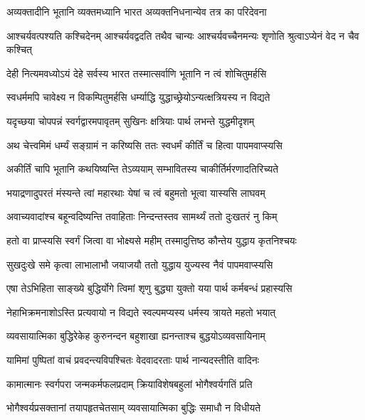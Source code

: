 \twolineshloka
{अव्यक्तादीनि भूतानि व्यक्तमध्यानि भारत}
{अव्यक्तनिधनान्येव तत्र का परिदेवना}%

\fourlineindentedshloka
{आश्चर्यवत्पश्यति कश्चिदेनम्}
{आश्चर्यवद्वदति तथैव चान्यः}
{आश्चर्यवच्चैनमन्यः शृणोति}
{श्रुत्वाऽप्येनं वेद न चैव कश्चित्}%

\twolineshloka
{देही नित्यमवध्योऽयं देहे सर्वस्य भारत}
{तस्मात्सर्वाणि भूतानि न त्वं शोचितुमर्हसि}%

\twolineshloka
{स्वधर्ममपि चावेक्ष्य न विकम्पितुमर्हसि}
{धर्म्याद्धि युद्धाच्छ्रेयोऽन्यत्क्षत्रियस्य न विद्यते}%

\twolineshloka
{यदृच्छया चोपपन्नं स्वर्गद्वारमपावृतम्}
{सुखिनः क्षत्रियाः पार्थ लभन्ते युद्धमीदृशम्}%

\twolineshloka
{अथ चेत्त्वमिमं धर्म्यं सङ्ग्रामं न करिष्यसि}
{ततः स्वधर्मं कीर्तिं च हित्वा पापमवाप्स्यसि}%

\twolineshloka
{अकीर्तिं चापि भूतानि कथयिष्यन्ति तेऽव्ययाम्}
{सम्भावितस्य चाकीर्तिर्मरणादतिरिच्यते}%

\twolineshloka
{भयाद्रणादुपरतं मंस्यन्ते त्वां महारथाः}
{येषां च त्वं बहुमतो भूत्वा यास्यसि लाघवम्}%

\twolineshloka
{अवाच्यवादांश्च बहून्वदिष्यन्ति तवाहिताः}
{निन्दन्तस्तव सामर्थ्यं ततो दुःखतरं नु किम्}%

\twolineshloka
{हतो वा प्राप्स्यसि स्वर्गं जित्वा वा भोक्ष्यसे महीम्}
{तस्मादुत्तिष्ठ कौन्तेय युद्धाय कृतनिश्चयः}%

\twolineshloka
{सुखदुःखे समे कृत्वा लाभालाभौ जयाजयौ}
{ततो युद्धाय युज्यस्व नैवं पापमवाप्स्यसि}%

\twolineshloka
{एषा तेऽभिहिता साङ्ख्ये बुद्धिर्योगे त्विमां शृणु}
{बुद्ध्या युक्तो यया पार्थ कर्मबन्धं प्रहास्यसि}%

\twolineshloka
{नेहाभिक्रमनाशोऽस्ति प्रत्यवायो न विद्यते}
{स्वल्पमप्यस्य धर्मस्य त्रायते महतो भयात्}%

\twolineshloka
{व्यवसायात्मिका बुद्धिरेकेह कुरुनन्दन}
{बहुशाखा ह्यनन्ताश्च बुद्धयोऽव्यवसायिनाम्}%

\twolineshloka
{यामिमां पुष्पितां वाचं प्रवदन्त्यविपश्चितः}
{वेदवादरताः पार्थ नान्यदस्तीति वादिनः}%

\twolineshloka
{कामात्मानः स्वर्गपरा जन्मकर्मफलप्रदाम्}
{क्रियाविशेषबहुलां भोगैश्वर्यगतिं प्रति}%

\twolineshloka
{भोगैश्वर्यप्रसक्तानां तयापहृतचेतसाम्}
{व्यवसायात्मिका बुद्धिः समाधौ न विधीयते}%

